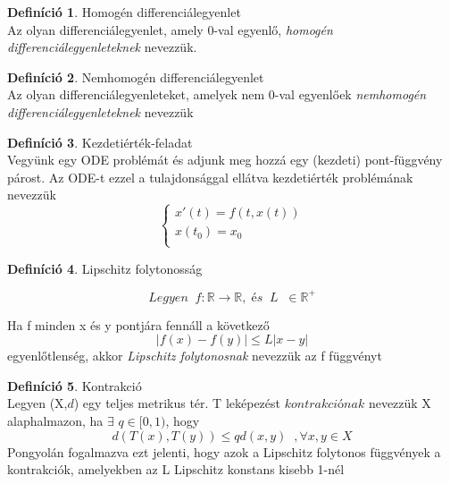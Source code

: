 \documentclass{article}
\theoremstyle{definition}
\theoremstyle{theorem}
\newtheorem{definition}{Definíció}
\begin{document}
\begin{definition}Homogén differenciálegyenlet\\
Az olyan differenciálegyenlet, amely 0-val egyenlő, \textit{homogén differenciálegyenleteknek} nevezzük.
\end{definition}
\begin{definition}Nemhomogén differenciálegyenlet\\
Az olyan differenciálegyenleteket, amelyek nem 0-val egyenlőek \textit{nemhomogén differenciálegyenleteknek} nevezzük
\end{definition}
\begin{definition}{Kezdetiérték-feladat}\\
Vegyünk egy ODE problémát és adjunk meg hozzá egy (kezdeti) pont-függvény párost. Az ODE-t ezzel a tulajdonsággal ellátva kezdetiérték problémának  nevezzük
\begin{equation*}
    \begin{cases}
       x'(t) = f(t,x(t))\\
       x(t_0) = x_0 \\
    \end{cases}       
\end{equation*}
\end{definition}
\begin{definition}{Lipschitz folytonosság}

\begin{equation*}
Legyen \;\;    f : \mathbb{R} \rightarrow \mathbb{R}, \; és \;\; L\; \;\in \mathbb{R}^+
\end{equation*}

Ha f minden x és y pontjára fennáll a következő 
\begin{equation*}
    |f(x) - f(y)| \leq L |x-y|
\end{equation*}
egyenlőtlenség, akkor \textit{Lipschitz folytonosnak} nevezzük az f függvényt
\end{definition}
\begin{definition}{Kontrakció}\\
Legyen (X,$\textit{d}$) egy teljes metrikus tér. T leképezést $\textit{kontrakciónak}$ nevezzük X alaphalmazon, ha $\exists$ $q \in [0,1)$, hogy 
\begin{equation*}
    d(T(x),T(y)) \leq q \textit{d}(x,y) \;\;,\forall x,y \in X
\end{equation*}
Pongyolán fogalmazva ezt jelenti, hogy azok a  Lipschitz folytonos függvények a kontrakciók, amelyekben az L Lipschitz konstans kisebb 1-nél 
\end{definition}
\end{document}
